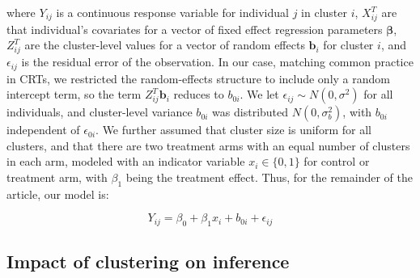 \documentclass[twocolumn]{bmcart}%
\begin{document}
where $Y_{ij}$ is a continuous response variable for individual $j$ in cluster $i$, $X_{ij}^T$ are that individual's covariates for a vector of fixed effect regression parameters $\boldsymbol{\beta}$, $Z_{ij}^T$ are the cluster-level values for a vector of random effects $\boldsymbol{b}_i$ for cluster $i$, and $\epsilon_{ij}$ is the residual error of the observation. In our case, matching common practice in CRTs, we restricted the random-effects structure to include only a random intercept term, so the term $Z_{ij}^T \boldsymbol{b}_i$ reduces to $b_{0i}$. We let $\epsilon_{ij} \sim N(0, \sigma^2)$ for all individuals, and cluster-level variance $b_{0i}$ was distributed $N(0, \sigma_b^2)$, with $b_{0i}$ independent of $\epsilon _{0i}$. We further assumed that cluster size is uniform for all clusters, and that there are two treatment arms with an equal number of clusters in each arm, modeled with an indicator variable $x_{i}\in \{0,1\}$ for control or treatment arm, with $\beta_1$ being the treatment effect. Thus, for the remainder of the article, our model is:

\begin{equation}
  \label{eq:2}
  Y_{ij} = \beta_0 + \beta_1 x_{i} + b_{0i} + \epsilon_{ij}
\end{equation}


\subsection*{Impact of clustering on inference}
\end{document}
